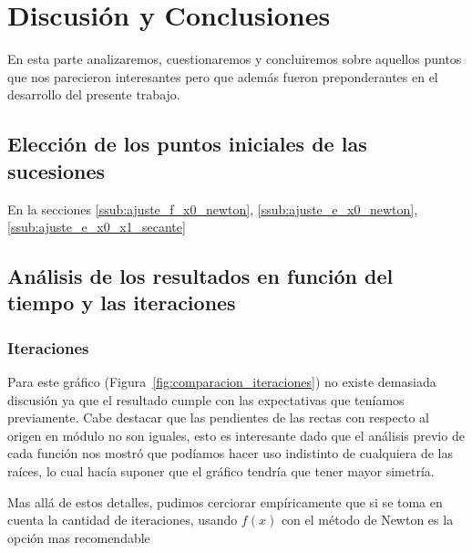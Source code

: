 \section{Discusión y Conclusiones}

En esta parte analizaremos, cuestionaremos y concluiremos sobre aquellos puntos
que nos parecieron interesantes pero que además fueron preponderantes en el
desarrollo del presente trabajo.

\subsection{Elección de los puntos iniciales de las sucesiones} %
\label{sub:elecci_n_de_los_puntos_iniciales_de_las_sucesiones}

En la secciones \ref{ssub:ajuste_f_x0_newton}, \ref{ssub:ajuste_e_x0_newton}, \ref{ssub:ajuste_e_x0_x1_secante}


\subsection{Análisis de los resultados en función del tiempo y las iteraciones} %
\label{sub:an_lisis_de_los_resultados_en_funci_n_del_tiempo_y_las_iteraciones}

\subsubsection{Iteraciones} %
\label{ssub:iteraciones}

Para este gráfico (Figura~\ref{fig:comparacion_iteraciones}) no existe
demasiada discusión ya que el resultado cumple con las expectativas que
teníamos previamente. Cabe destacar que las pendientes de las rectas con
respecto al origen en módulo no son iguales, esto es interesante dado que el
análisis previo de cada función nos mostró que podíamos hacer uso indistinto de
cualquiera de las raíces, lo cual hacía suponer que el gráfico tendría que
tener mayor simetría.

Mas allá de estos detalles, pudimos cerciorar empíricamente que si se toma en
cuenta la cantidad de iteraciones, usando $f(x)$ con el método de Newton es la
opción mas recomendable


